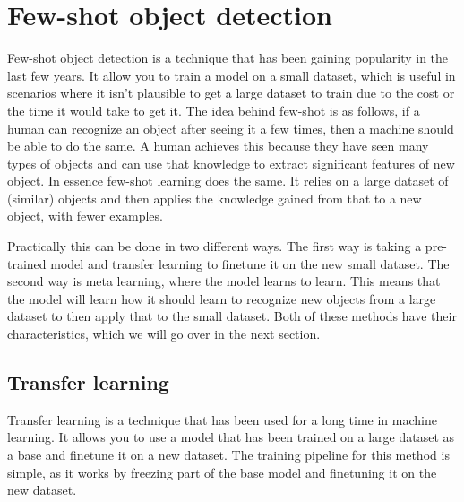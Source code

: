 

\section{Few-shot object detection}
Few-shot object detection is a technique that has been gaining popularity in the last few years. It allow you to train a model on a small dataset, which is useful in scenarios where it isn't plausible to get a large dataset to train due to the cost or the time it would take to get it. The idea behind few-shot is as follows, if a human can recognize an object after seeing it a few times, then a machine should be able to do the same. A human achieves this because they have seen many types of objects and can use that knowledge to extract significant features of new object. In essence few-shot learning does the same. It relies on a large dataset of (similar) objects and then applies the knowledge gained from that to a new object, with fewer examples.

Practically this can be done in two different ways. The first way is taking a pre-trained model and transfer learning to finetune it on the new small dataset. The second way is meta learning, where the model learns to learn. This means that the model will learn how it should learn to recognize new objects from a large dataset to then apply that to the small dataset. Both of these methods have their characteristics, which we will go over in the next section.

\subsection{Transfer learning}
Transfer learning is a technique that has been used for a long time in machine learning. It allows you to use a model that has been trained on a large dataset as a base and finetune it on a new dataset. The training pipeline for this method is simple, as it works by freezing part of the base model and finetuning it on the new dataset. 

